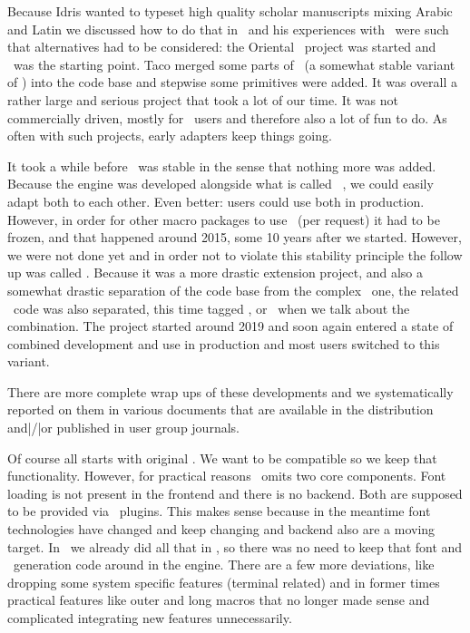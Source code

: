 Because Idris wanted to typeset high quality scholar manuscripts mixing Arabic
and Latin we discussed how to do that in \CONTEXT\ and his experiences with
\OMEGA\ were such that alternatives had to be considered: the Oriental \TEX\
project was started and \LUATEX\ was the starting point. Taco merged some parts
of \ALEPH\ (a somewhat stable variant of \OMEGA) into the code base and stepwise
some primitives were added. It was overall a rather large and serious project
that took a lot of our time. It was not commercially driven, mostly for \CONTEXT\
users and therefore also a lot of fun to do. As often with such projects, early
adapters keep things going.

It took a while before \LUATEX\ was stable in the sense that nothing more was
added. Because the engine was developed alongside what is called \CONTEXT\ \MKIV,
we could easily adapt both to each other. Even better: users could use both in
production. However, in order for other macro packages to use \LUATEX\ (per
request) it had to be frozen, and that happened around 2015, some 10 years after
we started. However, we were not done yet and in order not to violate this stability
principle the follow up was called \LUAMETATEX. Because it was a more drastic
extension project, and also a somewhat drastic separation of the code base from
the complex \LUATEX\ one, the related \CONTEXT\ code was also separated, this time
tagged \MKXL, or \LMTX\ when we talk about the combination. The project started
around 2019 and soon again entered a state of combined development and use in
production and most users switched to this variant.

There are more complete wrap ups of these developments and we systematically
reported on them in various documents that are available in the distribution
and|/|or published in user group journals.

\stopsection

\startsection[title={The engines}]

Of course all starts with original \TEX. We want to be compatible so we keep that
functionality. However, for practical reasons \LUAMETATEX\ omits two core
components. Font loading is not present in the frontend and there is no backend.
Both are supposed to be provided via \LUA\ plugins. This makes sense because in
the meantime font technologies have changed and keep changing and backend also
are a moving target. In \CONTEXT\ we already did all that in \LUA, so there was
no need to keep that font and \PDF\ generation code around in the engine. There
are a few more deviations, like dropping some system specific features (terminal
related) and in former times practical features like outer and long macros that
no longer made sense and complicated integrating new features unnecessarily.

